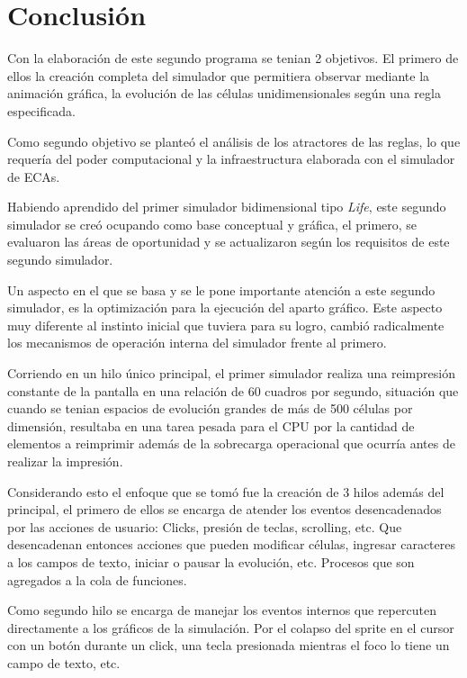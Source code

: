 \documentclass[]{article}
\begin{document}
	\section{Conclusión}
		Con la elaboración de este segundo programa se tenian 2 objetivos. El primero de ellos la creación completa del simulador que permitiera observar mediante la animación gráfica, la evolución de las células unidimensionales según una regla especificada.
		
		\hfill\break
		\justifying
		Como segundo objetivo se planteó el análisis de los atractores de las reglas, lo que requería del poder computacional y la infraestructura elaborada con el simulador de ECAs.
		
		\hfill\break
		\justifying
		Habiendo aprendido del primer simulador bidimensional tipo \textit{Life}, este segundo simulador se creó ocupando como base conceptual y gráfica, el primero, se evaluaron las áreas de oportunidad y se actualizaron según los requisitos de este segundo simulador.
		
		\hfill\break
		\justifying
		Un aspecto en el que se basa y se le pone importante atención a este segundo simulador, es la optimización para la ejecución del aparto gráfico. Este aspecto muy diferente al instinto inicial que tuviera para su logro, cambió radicalmente los mecanismos de operación interna del simulador frente al primero.
		
		\hfill\break
		\justifying
		Corriendo en un hilo único principal, el primer simulador realiza una reimpresión constante de la pantalla en una relación de 60 cuadros por segundo, situación que cuando se tenian espacios de evolución grandes de más de 500 células por dimensión, resultaba en una tarea pesada para el CPU por la cantidad de elementos a reimprimir además de la sobrecarga operacional que ocurría antes de realizar la impresión.
		
		\hfill\break
		\justifying
		Considerando esto el enfoque que se tomó fue la creación de 3 hilos además del principal, el primero de ellos se encarga de atender los eventos desencadenados por las acciones de usuario: Clicks, presión de teclas, scrolling, etc. Que desencadenan entonces acciones que pueden modificar células, ingresar caracteres a los campos de texto, iniciar o pausar la evolución, etc. Procesos que son agregados a la cola de funciones.
		
		\hfill\break
		\justifying
		Como segundo hilo se encarga de manejar los eventos internos que repercuten directamente a los gráficos de la simulación. Por el colapso del sprite en el cursor con un botón durante un click, una tecla presionada mientras el foco lo tiene un campo de texto, etc.
		
\end{document}
